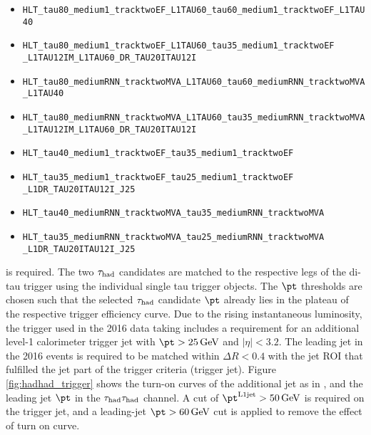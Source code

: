 \begin{itemize}
  \item \texttt{HLT\_tau80\_medium1\_tracktwoEF\_L1TAU60\_tau60\_medium1\_tracktwoEF\_L1TAU40}

  \item \texttt{HLT\_tau80\_medium1\_tracktwoEF\_L1TAU60\_tau35\_medium1\_tracktwoEF\\\_L1TAU12IM\_L1TAU60\_DR\_TAU20ITAU12I}

  \item \texttt{HLT\_tau80\_mediumRNN\_tracktwoMVA\_L1TAU60\_tau60\_mediumRNN\_tracktwoMVA\_L1TAU40}

  \item \texttt{HLT\_tau80\_mediumRNN\_tracktwoMVA\_L1TAU60\_tau35\_mediumRNN\_tracktwoMVA\\\_L1TAU12IM\_L1TAU60\_DR\_TAU20ITAU12I}

  \item \texttt{HLT\_tau40\_medium1\_tracktwoEF\_tau35\_medium1\_tracktwoEF}

  \item \texttt{HLT\_tau35\_medium1\_tracktwoEF\_tau25\_medium1\_tracktwoEF\\\_L1DR\_TAU20ITAU12I\_J25}

  \item \texttt{HLT\_tau40\_mediumRNN\_tracktwoMVA\_tau35\_mediumRNN\_tracktwoMVA}

  \item \texttt{HLT\_tau35\_mediumRNN\_tracktwoMVA\_tau25\_mediumRNN\_tracktwoMVA\\\_L1DR\_TAU20ITAU12I\_J25}
\end{itemize}



is required. The two $\tau_\text{had}$ candidates are matched to the respective legs of the di-tau trigger using the individual single tau trigger objects. The $\pt$ thresholds are chosen such that the selected $\tau_\text{had}$ candidate $\pt$ already lies in the plateau of the respective trigger efficiency curve. Due to the rising instantaneous luminosity, the trigger used in the 2016 data taking includes a requirement for an additional level-1 calorimeter trigger jet with $\pt > \SI{25}{\GeV}$ and $|\eta|<3.2$. The leading jet in the 2016 events is required to be matched within $\Delta R < 0.4$ with the jet ROI that fulfilled the jet part of the trigger criteria (trigger jet). Figure \ref{fig:hadhad_trigger} shows the turn-on curves of the additional jet as in \cite{Htautau}, and the leading jet $\pt$ in the $\tau_\text{had}{}\tau_\text{had}$ channel. A cut of $\pt^{\text{L1jet}} > \SI{50}{\GeV}$ is required on the trigger jet, and a leading-jet $\pt > \SI{60}{\GeV}$ cut is applied to remove the effect of turn on curve.

